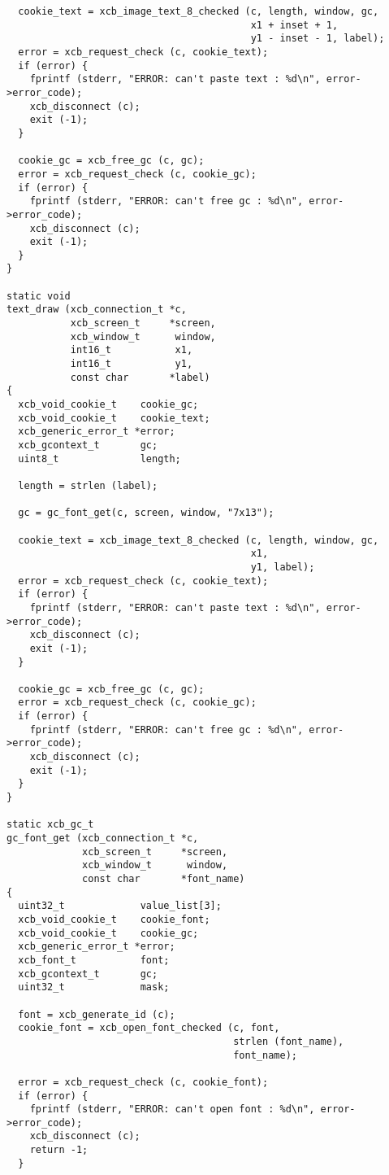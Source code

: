 \documentclass[12pt,oneside,titlepage]{book}
\begin{document}
\begin{enumerate}
\begin{enumerate}
\begin{verbatim}
  cookie_text = xcb_image_text_8_checked (c, length, window, gc,
                                          x1 + inset + 1,
                                          y1 - inset - 1, label);
  error = xcb_request_check (c, cookie_text);
  if (error) {
    fprintf (stderr, "ERROR: can't paste text : %d\n", error->error_code);
    xcb_disconnect (c);
    exit (-1);
  }

  cookie_gc = xcb_free_gc (c, gc);
  error = xcb_request_check (c, cookie_gc);
  if (error) {
    fprintf (stderr, "ERROR: can't free gc : %d\n", error->error_code);
    xcb_disconnect (c);
    exit (-1);
  }
}

static void
text_draw (xcb_connection_t *c,
           xcb_screen_t     *screen,
           xcb_window_t      window,
           int16_t           x1,
           int16_t           y1,
           const char       *label)
{
  xcb_void_cookie_t    cookie_gc;
  xcb_void_cookie_t    cookie_text;
  xcb_generic_error_t *error;
  xcb_gcontext_t       gc;
  uint8_t              length;

  length = strlen (label);

  gc = gc_font_get(c, screen, window, "7x13");

  cookie_text = xcb_image_text_8_checked (c, length, window, gc,
                                          x1,
                                          y1, label);
  error = xcb_request_check (c, cookie_text);
  if (error) {
    fprintf (stderr, "ERROR: can't paste text : %d\n", error->error_code);
    xcb_disconnect (c);
    exit (-1);
  }

  cookie_gc = xcb_free_gc (c, gc);
  error = xcb_request_check (c, cookie_gc);
  if (error) {
    fprintf (stderr, "ERROR: can't free gc : %d\n", error->error_code);
    xcb_disconnect (c);
    exit (-1);
  }
}

static xcb_gc_t
gc_font_get (xcb_connection_t *c,
             xcb_screen_t     *screen,
             xcb_window_t      window,
             const char       *font_name)
{
  uint32_t             value_list[3];
  xcb_void_cookie_t    cookie_font;
  xcb_void_cookie_t    cookie_gc;
  xcb_generic_error_t *error;
  xcb_font_t           font;
  xcb_gcontext_t       gc;
  uint32_t             mask;

  font = xcb_generate_id (c);
  cookie_font = xcb_open_font_checked (c, font,
                                       strlen (font_name),
                                       font_name);

  error = xcb_request_check (c, cookie_font);
  if (error) {
    fprintf (stderr, "ERROR: can't open font : %d\n", error->error_code);
    xcb_disconnect (c);
    return -1;
  }


\end{verbatim}
\end{enumerate}
\end{enumerate}
\end{document}
